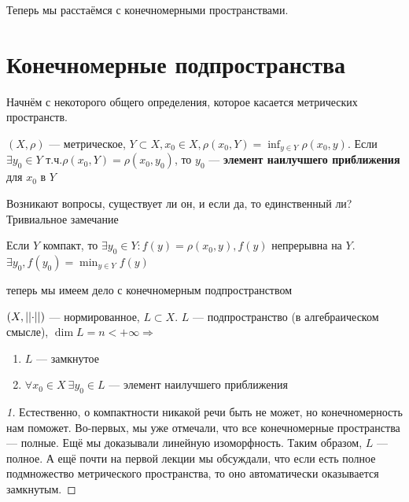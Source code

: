 \documentclass[document]{subfiles}
\begin{document}
Теперь мы расстаёмся с конечномерными пространствами.

\section{Конечномерные подпространства}

Начнём с некоторого общего определения, которое касается метрических пространств.
 
\begin{definition}
    $(X,\rho)$ --- метрическое, $Y \subset X, x_0 \in X, \rho(x_0,Y) = \inf_{y \in Y} \rho(x_0, y)$. Если $\exists y_0 \in Y$ т.ч.$ \rho(x_0, Y) = \rho(x_0,y_0)$, то
    $y_0$ --- \textbf{элемент наилучшего приближения} для $x_0$ в $Y$
\end{definition}

Возникают вопросы, существует ли он, и если да, то единственный ли? Тривиальное замечание
\begin{remark}
    Если $Y$ компакт, то $\exists y_0 \in Y : f(y) = \rho(x_0, y), f(y)$ непрерывна на $Y$. $\exists y_0, f(y_0) = \min_{y \in Y} f(y)$
\end{remark}


теперь мы имеем дело с конечномерным подпространством

\begin{theorem}
    $(X, \left|\left| {\cdot} \right| \right|)$ --- нормированное, $L \subset X$. $L$ --- подпространство (в алгебраическом смысле), $\dim L = n < + \infty \Rightarrow$
    \begin{enumerate}
        \item $L$ --- замкнутое \\
        \item $\forall x_0 \in X \: \exists y_0 \in L$ --- элемент наилучшего приближения
    \end{enumerate}
\end{theorem}

\begin{proof}[1]
    Естественно, о компактности никакой речи быть не может, но конечномерность нам поможет. Во-первых, мы уже отмечали, что все конечномерные пространства --- полные. Ещё мы доказывали линейную изоморфность.
Таким образом, $L$ --- полное. А ещё почти на первой лекции мы обсуждали, что если есть полное подмножество метрического пространства, то оно автоматически оказывается замкнутым.
\end{proof}
\end{document}
